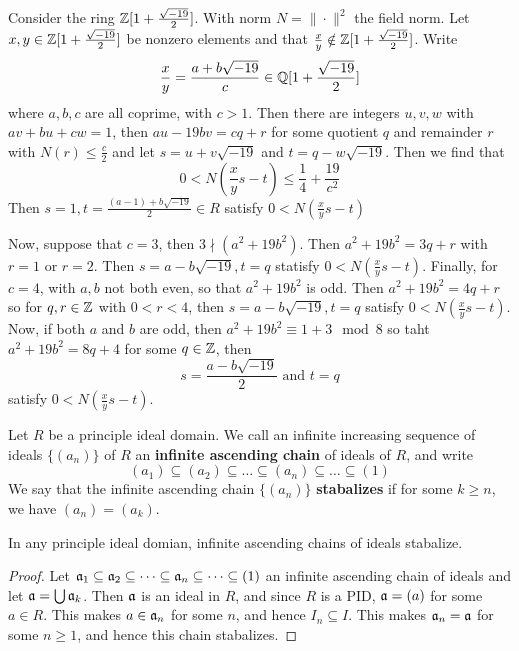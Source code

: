 \begin{example}\label{example_6.5}
  Consider the ring $\mathbb{Z}[1+\frac{\sqrt{-19}}{2}]$. With norm  $N=\|\cdot\|^2$
  the field norm. Let $x,y \in \mathbb{Z}[1+\frac{\sqrt{-19}}{2}]$ be nonzero elements
  and that $\frac{x}{y} \notin \mathbb{Z}[1+\frac{\sqrt{-19}}{2}]$. Write
  \begin{equation*}
    \frac{x}{y}=\frac{a+b\sqrt{-19}}{c} \in \mathbb{Q}[1+\frac{\sqrt{-19}}{2}]
  \end{equation*}
  where $a,b,c$ are all coprime, with  $c>1$. Then there are integers $u,v,w$
  with $av+bu+cw=1$, then  $au-19bv=cq+r$ for some quotient $q$ and remainder
  $r$ with  $N(r) \leq \frac{c}{2}$ and let $s=u+v\sqrt{-19}$ and
  $t=q-w\sqrt{-19}$. Then we find that
  \begin{equation*}
    0<N(\frac{x}{y}s-t) \leq \frac{1}{4}+\frac{19}{c^2}
  \end{equation*}
  Then $s=1, t=\frac{(a-1)+b\sqrt{-19}}{2} \in R$ satisfy $0<N(\frac{x}{y}s-t)$

  Now, suppose that $c=3$, then $3 \nmid (a^2+19b^2)$. Then $a^2+19b^2=3q+r$
  with  $r=1$ or $r=2$. Then $s=a-b\sqrt{-19},t=q$ statisfy
  $0<N(\frac{x}{y}s-t)$. Finally, for $c=4$, with $a,b$ not both even, so
  that $a^2+19b^2$ is odd. Then $a^2+19b^2=4q+r$ so for $q,r \in \mathbb{Z}$ with
  $0<r<4$, then $s=a-b\sqrt{-19}, t=q$ satisfy $0<N(\frac{x}{y}s-t)$. Now, if
  both $a$ and  $b$ are odd, then  $a^2+19b^2 \equiv 1+3 \mod{8}$ so taht
  $a^2+19b^2=8q+4$ for some  $q \in \mathbb{Z}$, then
  \begin{equation*}
    s=\frac{a-b\sqrt{-19}}{2} \text{ and } t=q
  \end{equation*}
  satisfy $0<N(\frac{x}{y}s-t)$.
\end{example}


\begin{definition}
  Let $R$ be a principle ideal domain. We call an infinite increasing sequence
  of ideals $\{(a_n)\}$ of $R$ an \textbf{infinite ascending chain} of
  ideals of $R$, and write
  \begin{equation*}
    (a_1) \subseteq (a_2) \subseteq \dots \subseteq (a_n) \subseteq \dots \subseteq (1)
  \end{equation*}
  We say that the infinite ascending chain $\{(a_n)\}$ \textbf{stabalizes} if
  for some $k \geq n$, we have  $(a_n)=(a_k)$.
\end{definition}

\begin{proposition}\label{proposition_6.2.4}
  In any principle ideal domian, infinite ascending chains of ideals
  stabalize.
\end{proposition}
\begin{proof}
  Let $\mathfrak{a}_1 \subseteq \mathfrak{a}_2 \subseteq \dots \subseteq \mathfrak{a}_n \subseteq
  \dots \subseteq (1)$ an infinite ascending chain of ideals and let
  $\mathfrak{a}=\bigcup{\mathfrak{a}_k}$. Then $\mathfrak{a}$ is an ideal in  $R$, and since
  $R$ is a PID,  $\mathfrak{a}=(a)$ for some $a \in R$. This makes  $a \in \mathfrak{a}_n$
  for some  $n$, and hence  $I_n \subseteq I$. This makes $\mathfrak{a}_n=\mathfrak{a}$ for some
  $n \geq 1$, and hence this chain stabalizes.
\end{proof}


